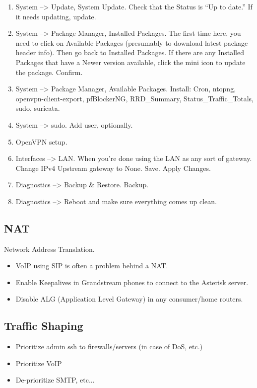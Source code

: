 \begin{enumerate}
 \item System --> Update, System Update. Check that the Status is ``Up to date.'' If it needs updating, update.
 \item System --> Package Manager, Installed Packages. The first time here, you need to click on Available Packages (presumably to download latest package header info). Then go back to Installed Packages. If there are any Installed Packages that have a Newer version available, click the mini icon to update the package. Confirm.
 \item System --> Package Manager, Available Packages. Install: Cron, ntopng, openvpn-client-export, pfBlockerNG, RRD\_Summary, Status\_Traffic\_Totals, sudo, suricata.
 \item System --> sudo. Add user, optionally.


 \item OpenVPN setup.
 \item Interfaces --> LAN. When you're done using the LAN as any sort of gateway. Change IPv4 Upstream gateway to None. Save. Apply Changes.
 \item Diagnostics --> Backup \& Restore. Backup.
 \item Diagnostics --> Reboot and make sure everything comes up clean.
\end{enumerate}


\subsection{NAT}
Network Address Translation.

\begin{itemize}
 \item VoIP using SIP is often a problem behind a NAT.
 \item Enable Keepalives in Grandstream phones to connect to the Asterisk server.
 \item Disable ALG (Application Level Gateway) in any consumer/home routers.
\end{itemize}


\subsection{Traffic Shaping}
\begin{itemize}
 \item Prioritize admin ssh to firewalls/servers (in case of DoS, etc.)
 \item Prioritize VoIP
 \item De-prioritize SMTP, etc...
\end{itemize}

